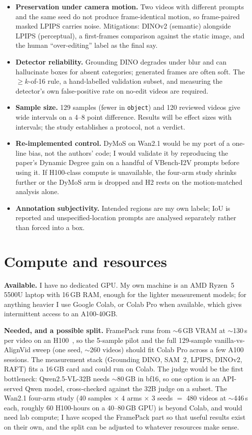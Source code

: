 \documentclass[10pt,a4paper]{article}
\begin{document}
\begin{itemize}
\item \textbf{Preservation under camera motion.} Two videos with different prompts and the same seed do not produce frame-identical motion, so frame-paired masked LPIPS carries noise. Mitigations: DINOv2 (semantic) alongside LPIPS (perceptual), a first-frames comparison against the static image, and the human ``over-editing'' label as the final say.
\item \textbf{Detector reliability.} Grounding DINO degrades under blur and can hallucinate boxes for absent categories; generated frames are often soft. The $\ge k$-of-16 rule, a hand-labelled validation subset, and measuring the detector's own false-positive rate on no-edit videos are required.
\item \textbf{Sample size.} 129 samples (fewer in \texttt{object}) and 120 reviewed videos give wide intervals on a 4--8 point difference. Results will be effect sizes with intervals; the study establishes a protocol, not a verdict.
\item \textbf{Re-implemented control.} DyMoS on Wan2.1 would be my port of a one-line bias, not the authors' code; I would validate it by reproducing the paper's Dynamic Degree gain on a handful of VBench-I2V prompts before using it. If H100-class compute is unavailable, the four-arm study shrinks further or the DyMoS arm is dropped and H2 rests on the motion-matched analysis alone.
\item \textbf{Annotation subjectivity.} Intended regions are my own labels; IoU is reported and unspecified-location prompts are analysed separately rather than forced into a box.
\end{itemize}

\section{Compute and resources}

\textbf{Available.} I have no dedicated GPU. My own machine is an AMD Ryzen~5 5500U laptop with 16\,GB RAM, enough for the lighter measurement models; for anything heavier I use Google Colab, or Colab Pro when available, which gives intermittent access to an A100-40GB.

\textbf{Needed, and a possible split.} FramePack runs from $\sim$6\,GB VRAM at $\sim$130\,s per video on an H100~\cite{alignvid}, so the 5-sample pilot and the full 129-sample vanilla-vs-AlignVid sweep (one seed, $\sim$260 videos) should fit Colab Pro across a few A100 sessions. The measurement stack (Grounding DINO, SAM~2, LPIPS, DINOv2, RAFT) fits a 16\,GB card and could run on Colab. The judge would be the first bottleneck: Qwen2.5-VL-32B needs $\sim$80\,GB in bf16, so one option is an API-served Qwen model, cross-checked against the 32B judge on a subset. The Wan2.1 four-arm study (40 samples $\times$ 4 arms $\times$ 3 seeds $=$ 480 videos at $\sim$446\,s each, roughly 60 H100-hours on a 40--80\,GB GPU) is beyond Colab, and would need lab compute; I have scoped the FramePack part so that useful results exist on their own, and the split can be adjusted to whatever resources make sense.
\end{document}
